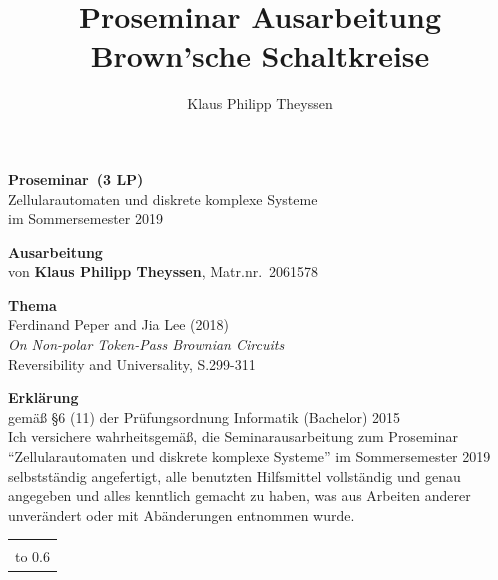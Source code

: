 \documentclass[11pt,a4paper]{article}
\author{Klaus Philipp Theyssen}
\title{Proseminar Ausarbeitung Brown'sche Schaltkreise}
\newcommand{\teilnehmername}{Klaus Philipp Theyssen} %
\newcommand{\teilnehmermatrnr}{2061578}        %
\newcommand{\seminarart}{Proseminar}           %
\newcommand{\seminarlp}{3 LP}                  %
\newcommand{\seminarjahr}{2019}                %
\begin{document}
{\thispagestyle{empty}\large\sffamily\raggedright
%
%
\unskip %
\noindent \textbf{\Large \seminarart\ (\seminarlp)} 
\\[\baselineskip]
%
Zellularautomaten und diskrete komplexe Systeme
\\[1ex]
%
im Sommersemester \seminarjahr

\vspace*{3\baselineskip}

\noindent \textbf{\Large Ausarbeitung} \\[\baselineskip]
%
von \textbf{\teilnehmername}, Matr.nr.~\teilnehmermatrnr

\vspace*{3\baselineskip}

\noindent \textbf{\Large Thema} \\[\baselineskip]
%
%
 Ferdinand Peper and Jia Lee (2018)\\[1ex]
%
\textit{On Non-polar Token-Pass Brownian Circuits}\\[1ex]
%
Reversibility and Universality, S.299-311
}
\clearpage
{\thispagestyle{empty}\raggedright

\noindent \textbf{\Large Erklärung}\\[1ex]
gemäß \S 6 (11) der Prüfungsordnung Informatik %
(Bachelor) 2015 %
\\[\baselineskip]

\noindent
Ich versichere wahrheitsgemäß, die Seminarausarbeitung zum
\seminarart{} "`Zellularautomaten und diskrete komplexe Systeme"' im
Sommersemester \seminarjahr{} selbstständig angefertigt, alle
benutzten Hilfsmittel vollständig und genau angegeben und alles
kenntlich gemacht zu haben, was aus Arbeiten anderer unverändert oder
mit Abänderungen entnommen wurde.

\vspace*{30mm}
\noindent
\begin{tabular}{@{}l}
  \hline
   \\[-1ex]
  \hbox to 0.6\textwidth{(\teilnehmername, Matr.nr.~\teilnehmermatrnr) \hss}
\end{tabular}
}
\clearpage
\end{document}
